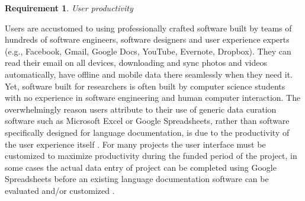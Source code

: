 \documentclass[11pt]{article}
\newtheorem{requirement}{Requirement}
\begin{document}

\begin{requirement}
	\label{req:productivity}
       User productivity
\end{requirement}


Users  are accustomed to using professionally crafted
software built by teams of hundreds of software engineers, software designers and user experience experts
(e.g., Facebook, Gmail, Google Docs, YouTube, Evernote, Dropbox). They can read
their email on all devices, downloading and sync photos and videos
automatically, have offline and mobile data there seamlessly when they need it.
Yet, software built for researchers is often built by computer science students with no experience in software engineering and human computer interaction.
The overwhelmingly  reason users attribute to their use of generic data curation software such as Microsoft Excel or Google Spreadsheets, rather than software specifically designed for language documentation, is due to the productivity of the user experience itself  \cite{lingsync:2012}. 
For many projects the user interface must be customized to maximize productivity during the funded period of the project, in some cases the actual data entry of project can be completed using Google Spreadsheets before an existing language documentation software can be evaluated and/or customized \cite{Troy:2014}. 
\end{document}
